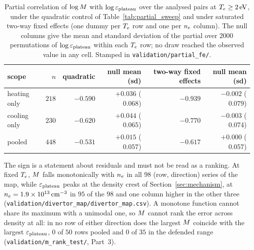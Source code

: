\begin{table}[htbp]
\centering
\caption{Partial correlation of $\log M$ with $\log\varepsilon_{\mathrm{plateau}}$ over the
analysed pairs at $T_e\ge\SI{2}{\electronvolt}$, under the quadratic control
of Table~\ref{tab:partial_sweep} and under saturated two-way fixed effects
(one dummy per $T_e$ row and one per $n_e$ column). The null columns give the
mean and standard deviation of the partial over $2000$ permutations of
$\log\varepsilon_{\mathrm{plateau}}$ within each $T_e$ row; no draw reached the observed value in
any cell. Stamped in \texttt{validation/partial\_fe/}.}
\label{tab:partial_fe}
\begin{tabular}{lrrrrr}
  \toprule
  scope & $n$ & quadratic & null mean (sd) & two-way fixed effects & null mean (sd) \\
  \midrule
  heating only & $218$ & $-0.590$ & $+0.036$ ($0.068$) & $-0.939$ & $-0.002$ ($0.079$) \\
  cooling only & $230$ & $-0.620$ & $+0.044$ ($0.065$) & $-0.770$ & $-0.003$ ($0.074$) \\
  pooled       & $448$ & $-0.531$ & $+0.015$ ($0.057$) & $-0.617$ & $+0.000$ ($0.057$) \\
  \bottomrule
\end{tabular}
\end{table}

The sign is a statement about residuals and must not be read as a ranking. At
fixed $T_e$, $M$ falls monotonically with $n_e$ in all $98$ (row,
direction) series of the map, while $\varepsilon_{\mathrm{plateau}}$ peaks at the density crest of
Section~\ref{sec:mechanism}, at $n_e = \SI{1.9e13}{\per\cubic\centi\metre}$ in
$95$ of the $98$ and one column higher in the other three
(\texttt{validation/divertor\_map/divertor\_map.csv}). A monotone function
cannot share its maximum with a unimodal one, so $M$ cannot rank the error
across density at all: in no row of either direction does the largest $M$
coincide with the largest $\varepsilon_{\mathrm{plateau}}$, $0$ of $50$ rows pooled and $0$ of $35$
in the defended range (\texttt{validation/m\_rank\_test/}, Part~3).

